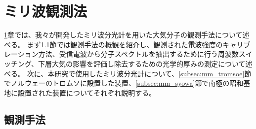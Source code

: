 \chapter{ミリ波観測法}
\label{ch:mm_obs}
\ref{ch:mm_obs}章では、我々が開発したミリ波分光計を用いた大気分子の観測手法について述べる。
まず\ref{sec:mm_obs}節では観測手法の概観を紹介し、観測された電波強度のキャリブレーション方法、受信電波から分子スペクトルを抽出するために行う周波数スイッチング、下層大気の影響を評価し除去するための光学的厚みの測定について述べる。
次に、本研究で使用したミリ波分光計について、\ref{subsec:mm_tromsoe}節でノルウェーのトロムソに設置した装置、\ref{subsec:mm_syowa}節で南極の昭和基地に設置された装置についてそれぞれ説明する。

\section{観測手法}
\label{sec:mm_obs}
